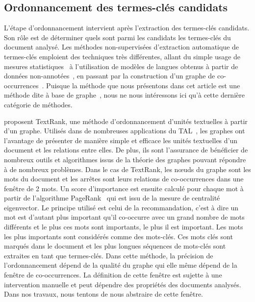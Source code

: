  \subsection{Ordonnancement des termes-clés candidats}
  \label{subsec:ordonnancement_des_termes_cles_candidats}
    L'étape d'ordonnancement intervient après l'extraction des termes-clés
    candidats. Son rôle est de déterminer quels sont parmi les candidats les
    termes-clés du document analysé.
    Les méthodes non-supervisées d'extraction automatique de termes-clés
    emploient des techniques très différentes, allant du simple usage de mesures
    statistiques~\cite{jones1972tfidf,paukkeri2010likey} à l'utilisation de
    modèles de langues obtenus à partir de données
    non-annotées~\cite{tomokiyo2003languagemodel}, en passant par la
    construction d'un graphe de co-occurrences~\cite{mihalcea2004textrank}.
    Puisque la méthode que nous présentons dans cet article est une méthode dite
    \og à base de graphe~\fg, nous ne nous intéressons ici qu'à cette dernière
    catégorie de méthodes.

     proposent TextRank, une méthode
    d'ordonnancement d'unités textuelles à partir d'un graphe. Utilisés dans de
    nombreuses applications du TAL~\cite{kozareva2013textgraphs}, les graphes
    ont l'avantage de présenter de manière simple et efficace les unités
    textuelles d'un document et les relations entre elles. De plus, ils sont
    l'assurance de bénéficier de nombreux outils et algorithmes issus de la
    théorie des graphes pouvant répondre à de nombreux problèmes. Dans le cas de
    TextRank, les n\oe{}uds du graphe sont les mots du document et les arrêtes
    sont leurs relations de co-occurrences dans une fenêtre de 2 mots. Un score
    d'importance est ensuite calculé pour chaque mot à partir de l'algorithme
    PageRank~\cite{brin1998pagerank} qui est issu de la mesure de centralité
    eigenvector. Le principe utilisé est celui de la recommandation, c'est à
    dire un mot est d'autant plus important qu'il co-occurre avec un grand
    nombre de mots différents et le plus ces mots sont importants, le plus il
    est important. Les mots les plus importants sont considérés comme des
    mots-clés. Ces mots clés sont marqués dans le document et les plus longues
    séquences de mots-clés sont extraites en tant que termes-clés. Dans cette
    méthode, la précision de l'ordonnancement dépend de la qualité du graphe qui
    elle même dépend de la fenêtre de co-occurrences. La définition de cette
    fenêtre est sujette à une intervention manuelle et peut dépendre des
    propriétés des documents analysés. Dans nos travaux, nous tentons de nous
    abstraire de cette fenêtre.

